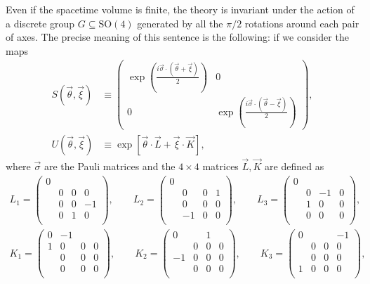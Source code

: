 \documentclass[a4paper, 11pt]{article}
\theoremstyle{thm}
\begin{document}
Even if the spacetime volume is finite, the theory is invariant under the action of a discrete group $G \subseteq \mathrm{SO}(4)$ generated by all the $\pi/2$ rotations around each pair of axes. The precise meaning of this sentence is the following: if we consider the maps
\begin{align*}
S(\vec{\theta}, \vec{\xi}) 
& \equiv 
\begin{pmatrix}
\displaystyle \exp \left( \frac{i \vec{\sigma} \cdot (\vec{\theta} + \vec{\xi})}{2} \right)	&	0 \\[3pt]
\displaystyle
0									& \displaystyle \exp \left( \frac{i \vec{\sigma} \cdot (\vec{\theta} - \vec{\xi})}{2} \right)
\end{pmatrix}, \\
U(\vec{\theta}, \vec{\xi}) 
& \equiv \exp[\vec{\theta} \cdot \vec{L} + \vec{\xi} \cdot \vec{K}],
\end{align*}
where $\vec{\sigma}$ are the Pauli matrices and the $4 \times 4$ matrices $\vec{L}, \vec{K}$ are defined as
\begin{align*}
L_1 = 
\begin{pmatrix}
0	&		&		&		\\	
	&	0	&	0	&	0	\\	
	&	0	&	0	&	-1	\\
	&	0	&	1	&	0	\\		
\end{pmatrix}, \qquad
L_2 = 
\begin{pmatrix}
0	&		&		&		\\	
	&	0	&	0	&	1	\\	
	&	0	&	0	&	0	\\
	&	-1	&	0	&	0	\\		
\end{pmatrix}, \qquad
L_3 = 
\begin{pmatrix}
0	&		&		&		\\	
	&	0	&	-1	&	0	\\	
	&	1	&	0	&	0	\\
	&	0	&	0	&	0	\\		
\end{pmatrix}, \\[4pt]
K_1 = 
\begin{pmatrix}
0	&	-1	&		&		\\	
1	&	0	&	0	&	0	\\
	&	0	&	0	&	0	\\		
	&	0	&	0	&	0	\\	
\end{pmatrix}, \qquad
K_2 = 
\begin{pmatrix}
0	&		&	1	&		\\	
	&	0	&	0	&	0	\\	
-1	&	0	&	0	&	0	\\		
	&	0	&	0	&	0	\\	
\end{pmatrix}, \qquad
K_3 = 
\begin{pmatrix}
0	&		&		&	-1	\\	
	&	0	&	0	&	0	\\	
	&	0	&	0	&	0	\\		
1	&	0	&	0	&	0	\\	
\end{pmatrix},
\end{align*}
\end{document}
